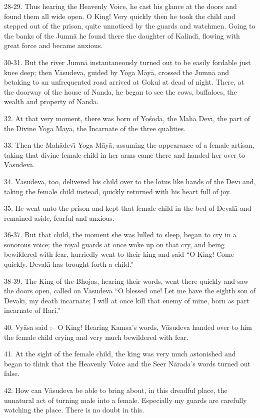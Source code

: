 28-29. Thus hearing the Heavenly Voice, he cast his glance at the doors and found them all wide open. O King! Very quickly then he took the child and stepped out of the prison, quite unnoticed by the guards and watchmen. Going to the banks of the Jumn\=a he found there the daughter of Kalindi, flowing with great force and became anxious.

30-31. But the river Jumn\=a instantaneously turned out to be easily fordable just knee deep; then V\=asudeva, guided by Yoga M\=ay\=a, crossed the Jumn\=a and betaking to an unfrequented road arrived at Gokul at dead of night. There, at the doorway of the house of Nanda, he began to see the cows, buffaloes, the wealth and property of Nanda.

32. At that very moment, there was born of Yo\'sod\=a, the Mah\=a Dev\={\i}, the part of the Divine Yoga M\=ay\=a, the Incarnate of the three qualities.

33. Then the Mah\=adev\={\i} Yoga M\=ay\=a, assuming the appearance of a female artisan, taking that divine female child in her arms came there and handed her over to V\=asudeva.

34. V\=asudeva, too, delivered his child over to the lotus like hands of the Dev\={\i} and, taking the female child instead, quickly returned with his heart full of joy.

35. He went unto the prison and kept that female child in the bed of Devak\={\i} and remained aside, fearful and anxious.

36-37. But that child, the moment she was lulled to sleep, began to cry in a sonorous voice; the royal guards at once woke up on that cry, and being bewildered with fear, hurriedly went to their king and said ``O King! Come quickly. Devak\={\i} has brought forth a child.''

38-39. The King of the Bhojas, hearing their words, went there quickly and saw the doors open, called on V\=asudeva ``O blessed one! Let me have the eighth son of Devak\={\i}, my death incarnate; I will at once kill that enemy of mine, born as part incarnate of Hari.''

40. Vy\=asa said :-- O King! Hearing Kamsa's words, V\=asudeva handed over to him the female child crying and very much bewildered with fear.

41. At the sight of the female child, the king was very much astonished and began to think that the Heavenly Voice and the Seer N\=arada's words turned out false.

42. How can V\=asudeva be able to bring about, in this dreadful place, the unnatural act of turning male into a female. Especially my guards are carefully watching the place. There is no doubt in this.

